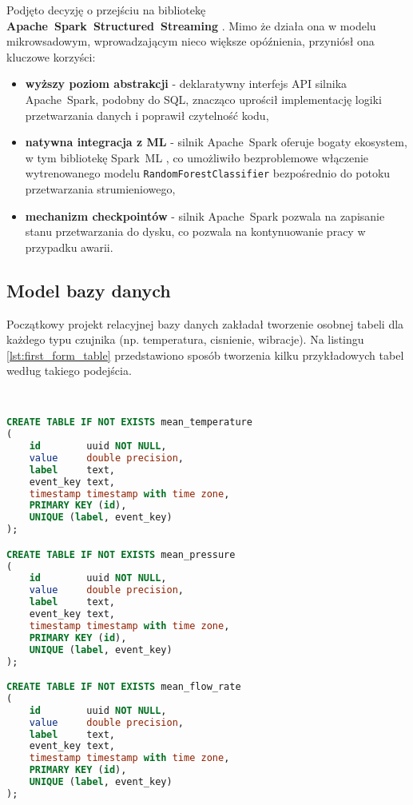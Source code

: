 Podjęto decyzję o przejściu na bibliotekę \textbf{\mbox{Apache Spark Structured Streaming}} \cite{spark_streaming}. Mimo że działa ona w modelu mikrowsadowym, wprowadzającym nieco większe opóźnienia, przyniósł ona kluczowe korzyści:
\begin{itemize}
    \item \textbf{wyższy poziom abstrakcji} - deklaratywny interfejs API silnika \mbox{Apache Spark}, podobny do SQL, znacząco uprościł implementację logiki przetwarzania danych i poprawił czytelność kodu,
    \item \textbf{natywna integracja z ML} - silnik \mbox{Apache Spark} oferuje bogaty ekosystem, w tym bibliotekę \mbox{Spark ML} \cite{spark_streaming}, co umożliwiło bezproblemowe włączenie wytrenowanego modelu \texttt{RandomForestClassifier} bezpośrednio do potoku przetwarzania strumieniowego,
    \item \textbf{mechanizm checkpointów} - silnik \mbox{Apache Spark} pozwala na zapisanie stanu przetwarzania do dysku, co pozwala na kontynuowanie pracy w przypadku awarii.
\end{itemize}

\newpage

\subsection{Model bazy danych}

Początkowy projekt relacyjnej bazy danych zakładał tworzenie osobnej tabeli dla każdego typu czujnika (np. temperatura, cisnienie, wibracje). Na listingu \ref{lst:first_form_table} przedstawiono sposób tworzenia kilku przykładowych tabel według takiego podejścia.

\begin{lstlisting}[caption={Pierwsza forma tabeli w relacyjnej bazie danych}, label={lst:first_form_table},language=SQL]


CREATE TABLE IF NOT EXISTS mean_temperature
(
    id        uuid NOT NULL,
    value     double precision,
    label     text,
    event_key text,
    timestamp timestamp with time zone,
    PRIMARY KEY (id),
    UNIQUE (label, event_key)
);

CREATE TABLE IF NOT EXISTS mean_pressure
(
    id        uuid NOT NULL,
    value     double precision,
    label     text,
    event_key text,
    timestamp timestamp with time zone,
    PRIMARY KEY (id),
    UNIQUE (label, event_key)
);

CREATE TABLE IF NOT EXISTS mean_flow_rate
(
    id        uuid NOT NULL,
    value     double precision,
    label     text,
    event_key text,
    timestamp timestamp with time zone,
    PRIMARY KEY (id),
    UNIQUE (label, event_key)
);

\end{lstlisting}

